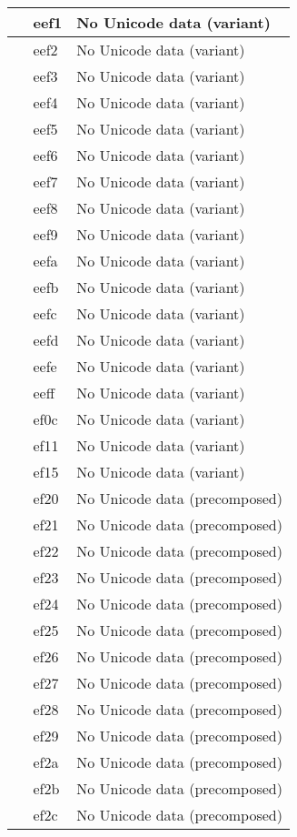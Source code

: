 \documentclass[12pt,letterpaper,openany]{book}
\begin{document}
\begin{center}
\begin{supertabular}{|m{0.25in}|m{0.5in}|m{4in}|}
 & eef1 & No Unicode data (variant)\\\hline
 & eef2 & No Unicode data (variant)\\\hline
 & eef3 & No Unicode data (variant)\\\hline
 & eef4 & No Unicode data (variant)\\\hline
 & eef5 & No Unicode data (variant)\\\hline
 & eef6 & No Unicode data (variant)\\\hline
 & eef7 & No Unicode data (variant)\\\hline
 & eef8 & No Unicode data (variant)\\\hline
 & eef9 & No Unicode data (variant)\\\hline
 & eefa & No Unicode data (variant)\\\hline
 & eefb & No Unicode data (variant)\\\hline
 & eefc & No Unicode data (variant)\\\hline
 & eefd & No Unicode data (variant)\\\hline
 & eefe & No Unicode data (variant)\\\hline
 & eeff & No Unicode data (variant)\\\hline
 & ef0c & No Unicode data (variant)\\\hline
 & ef11 & No Unicode data (variant)\\\hline
 & ef15 & No Unicode data (variant)\\\hline
 & ef20 & No Unicode data (precomposed)\\\hline
 & ef21 & No Unicode data (precomposed)\\\hline
 & ef22 & No Unicode data (precomposed)\\\hline
 & ef23 & No Unicode data (precomposed)\\\hline
 & ef24 & No Unicode data (precomposed)\\\hline
 & ef25 & No Unicode data (precomposed)\\\hline
 & ef26 & No Unicode data (precomposed)\\\hline
 & ef27 & No Unicode data (precomposed)\\\hline
 & ef28 & No Unicode data (precomposed)\\\hline
 & ef29 & No Unicode data (precomposed)\\\hline
 & ef2a & No Unicode data (precomposed)\\\hline
 & ef2b & No Unicode data (precomposed)\\\hline
 & ef2c & No Unicode data (precomposed)\\\hline

\end{supertabular}
\end{center}
\end{document}
